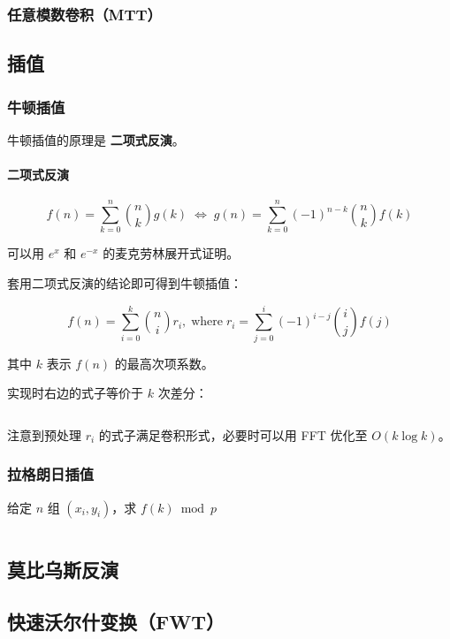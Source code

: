 \documentclass[a4paper, twoside]{article}
\begin{document}
    \subsubsection{任意模数卷积（MTT）}

\subsection{插值}
    \subsubsection{牛顿插值}
    \label{NewtonInterpolation}
    牛顿插值的原理是 \textbf{二项式反演}。

    \paragraph{二项式反演}
    
        $$ f(n) = \sum_{k = 0} ^ n \binom{n}{k} g(k) \; \iff \; g(n) = \sum_{k = 0} ^ n \left( -1 \right) ^ {n - k} \binom{n}{k} f(k) $$
    
    可以用 $e^x$ 和 $e^{-x}$ 的麦克劳林展开式证明。
    
    套用二项式反演的结论即可得到牛顿插值：
    
        $$ f(n) = \sum_{i = 0} ^ k \binom{n}{i} r_i , \; \text{where} \; r_i = \sum_{j = 0} ^ i (-1) ^ {i - j} \binom{i}{j} f(j) $$
    
    其中 $k$ 表示 $f(n)$ 的最高次项系数。
    
    实现时右边的式子等价于 $k$ 次差分：
    
    \inputminted{cpp}{../src/数学/牛顿插值.cpp}
    
    注意到预处理 $r_i$ 的式子满足卷积形式，必要时可以用 FFT 优化至 $O(k\log k)$。

    \subsubsection{拉格朗日插值}
    给定 $n$ 组 $(x_i, y_i)$，求 $f(k) \bmod p$
    \inputminted{cpp}{../src/数学/拉格朗日插值.cpp}

\subsection{莫比乌斯反演}

\subsection{快速沃尔什变换（FWT）}
\end{document}

